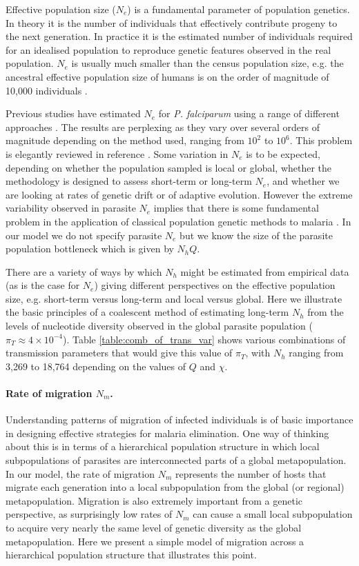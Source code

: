 \documentclass[_main.tex]{subfiles}
\begin{document}
Effective population size ($N_e$) is a fundamental parameter of population genetics.  In theory it is the number of individuals that effectively contribute progeny to the next generation. In practice it is the estimated number of individuals required for an idealised population to reproduce genetic features observed in the real population.  $N_e$ is usually much smaller than the census population size, e.g. the ancestral effective population size of humans is on the order of magnitude of 10,000 individuals \cite{Henn2012}. 

Previous studies have estimated $N_e$ for \textit{P. falciparum} using a range of different approaches  \cite{Joy2003,Chang2012,Nkhoma2013,Anderson2017}.  The results are perplexing as they vary over several orders of magnitude depending on the method used, ranging from $10^2$ to $10^6$.  This problem is elegantly reviewed in reference \cite{Anderson2017}.  Some variation in $N_e$ is to be expected, depending on whether the population sampled is local or global, whether the methodology is designed to assess short-term or long-term $N_e$, and whether we are looking at rates of genetic drift or of adaptive evolution.  However the extreme variability observed in parasite $N_e$ implies that there is some fundamental problem in the application of classical population genetic methods to malaria \cite{Chan2013,Chang2015,Anderson2017}.  In our model we do not specify parasite $N_e$ but we know the size of the parasite population bottleneck which is given by $N_h Q$.  

There are a variety of ways by which $N_h$ might be estimated from empirical data (as is the case for $N_e$) giving different perspectives on the effective population size, e.g. short-term versus long-term and local versus global.  Here we illustrate the basic principles of a coalescent method of estimating long-term $N_h$ from the levels of nucleotide diversity observed in the global parasite population ($\pi_T \approx 4 \times 10^{-4}$).  Table \ref{table:comb_of_trans_var} shows various combinations of transmission parameters that would give this value of $\pi_T$, with $N_h$ ranging from 3,269 to 18,764 depending on the values of $Q$ and $\chi$.

\paragraph{Rate of migration $N_m$.}  Understanding patterns of migration of infected individuals is of basic importance in designing effective strategies for malaria elimination.  One way of thinking about this is in terms of a hierarchical population structure in which local subpopulations of parasites are interconnected parts of a global metapopulation.  In our model, the rate of migration $N_m$ represents the number of hosts that migrate each generation into a local subpopulation from the global (or regional) metapopulation.  Migration is also extremely important from a genetic perspective, as surprisingly low rates of $N_m$ can cause a small local subpopulation to acquire very nearly the same level of genetic diversity as the global metapopulation.  Here we present a simple model of migration across a hierarchical population structure that illustrates this point.
\end{document}
